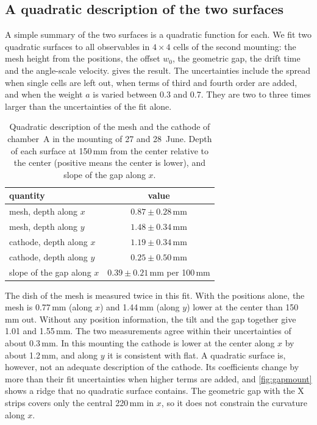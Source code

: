 \subsection{A quadratic description of the two surfaces}
A simple summary of the two surfaces is a quadratic function for each. We fit two quadratic surfaces to all
observables in $4\times4$ cells of the second mounting: the mesh height from the positions, the offset $w_0$, the
geometric gap, the drift time and the angle-scale velocity.  gives the result. The uncertainties
include the spread when single cells are left out, when terms of third and fourth order are added, and when the
weight $a$ is varied between 0.3 and 0.7. They are two to three times larger than the uncertainties of the fit alone.

\begin{table}[tbp]
  \centering
  \caption{Quadratic description of the mesh and the cathode of chamber~A in the mounting of 27 and 28~June. Depth
  of each surface at 150\,mm from the center relative to the center (positive means the center is lower), and slope
  of the gap along $x$.}
  \label{tab:surfaces}
  \small
  \begin{tabular}{lc}
    \hline
    quantity & value \\
    \hline
    mesh, depth along $x$ & $0.87\pm0.28$\,mm \\
    mesh, depth along $y$ & $1.48\pm0.34$\,mm \\
    cathode, depth along $x$ & $1.19\pm0.34$\,mm \\
    cathode, depth along $y$ & $0.25\pm0.50$\,mm \\
    slope of the gap along $x$ & $0.39\pm0.21$\,mm per 100\,mm \\
    \hline
  \end{tabular}
\end{table}

The dish of the mesh is measured twice in this fit. With the positions alone, the mesh is 0.77\,mm (along $x$) and
1.44\,mm (along $y$) lower at the center than 150\,mm out. Without any position information, the tilt and the gap
together give 1.01 and 1.55\,mm. The two measurements agree within their uncertainties of about 0.3\,mm. In this
mounting the cathode is lower at the center along $x$ by about 1.2\,mm, and along $y$ it is consistent with flat. A
quadratic surface is, however, not an adequate description of the cathode. Its coefficients change by more than their
fit uncertainties when higher terms are added, and \cref{fig:gapmount} shows a ridge that no quadratic surface
contains. The geometric gap with the X strips covers only the central 220\,mm in $x$, so it does not constrain the
curvature along $x$.

